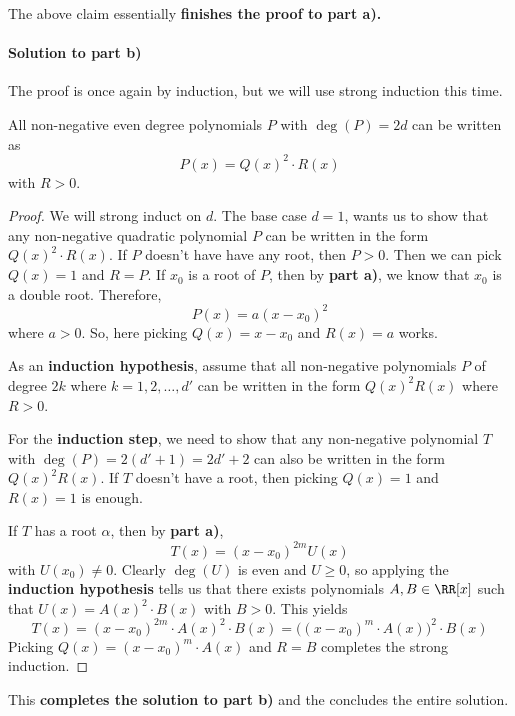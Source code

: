 \documentclass[numbers=endperiod, 11pt]{scrartcl}
\begin{document}
\begin{sol}
    \noindent The above claim essentially
    \textbf{finishes the proof to part a).} \bsquare

    \paragraph{Solution to part b)} The proof is once again
    by induction, but we will use strong induction this time.

    \begin{claim*}
        All non-negative even degree polynomials $P$ with
        $\deg(P) = 2d$ can be written as
        \[ P(x) = Q(x)^2\cdot R(x)\]
        with $R > 0$.
    \end{claim*}
    \begin{proof}
        We will strong induct on $d$. The base case $d = 1$,
        wants us to show that any non-negative quadratic
        polynomial $P$ can be written in the form
        $Q(x)^2\cdot R(x)$. If $P$ doesn't have have any
        root, then $P > 0$. Then we can pick $Q(x) = 1$
        and $R = P$. If $x_0$ is a root of $P$, then
        by \textbf{part a)}, we know that $x_0$ is a double
        root. Therefore,
        \[P(x) = a(x-x_0)^2 \]
        where $a > 0$. So, here picking $Q(x) = x-x_0$ and
        $R(x) = a$ works.

        As an \textbf{induction hypothesis}, assume that
        all non-negative polynomials $P$ of degree
        $2k$ where $k = 1,2,\dots, d'$ can be written in the
        form $Q(x)^2R(x)$ where $R > 0$.

        For the \textbf{induction step}, we need to show
        that any non-negative polynomial $T$ with
        $\deg(P) = 2(d'+1) = 2d'+2$ can also be written in
        the form $Q(x)^2R(x)$. If $T$ doesn't have a root,
        then picking $Q(x) = 1$ and $R(x) = 1$ is enough.

        If $T$ has a root $\alpha$, then by \textbf{part a)},
        \[ T(x) = (x-x_0)^{2m}U(x)\]
        with $U(x_0) \ne 0$. Clearly $\deg(U)$ is even
        and $U \ge 0$, so applying the \textbf{induction
            hypothesis} tells us that there exists polynomials
        $A,B \in \RR[x]$ such that $U(x) = A(x)^2\cdot B(x)$
        with $B > 0$. This yields
        \[ T(x) = (x-x_0)^{2m}\cdot A(x)^2\cdot B(x) = \big((x-x_0)^m\cdot A(x)\big)^2\cdot B(x)\]
        Picking $Q(x) = (x-x_0)^m\cdot A(x)$ and $R = B$
        completes the strong induction.
    \end{proof}

    \noindent This \textbf{completes the solution to
        part b)} and the concludes the entire solution.
\end{sol}
\newpage
\end{document}

